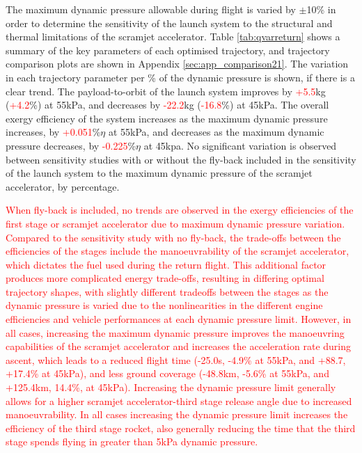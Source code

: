 The maximum dynamic pressure allowable during flight is varied by $\pm$10\% in order to determine the sensitivity of the launch system to the structural and thermal limitations of the scramjet accelerator.  
Table \ref{tab:qvarreturn} shows a summary of the key parameters of each optimised trajectory, and trajectory comparison plots are shown in Appendix \ref{sec:app_comparison21}. The variation in each trajectory parameter per \% of the dynamic pressure is shown, if there is a clear trend. The payload-to-orbit of the launch system improves by \textcolor{red}{+5.5}kg (\textcolor{red}{+4.2}\%) at 55kPa, and decreases by \textcolor{red}{-22.2}kg (\textcolor{red}{-16.8}\%) at 45kPa.
The overall exergy efficiency of the system increases as the maximum dynamic pressure increases, by \textcolor{red}{+0.051}\%$\eta$ at 55kPa, and decreases as the maximum dynamic pressure decreases, by \textcolor{red}{-0.225}\%$\eta$ at 45kpa. 
No significant variation is observed between sensitivity studies with or without the fly-back included in the sensitivity of the launch system to the maximum dynamic pressure of the scramjet accelerator, by percentage.

\textcolor{red}{
When fly-back is included, no trends are observed in the exergy efficiencies of the first stage or scramjet accelerator due to maximum dynamic pressure variation. Compared to the sensitivity study with no fly-back, the trade-offs between the efficiencies of the stages include the manoeuvrability of the scramjet accelerator, which dictates the fuel used during the return flight. This additional factor produces more complicated energy trade-offs, resulting in differing optimal trajectory shapes, with slightly different tradeoffs between the stages as the dynamic pressure is varied due to the nonlinearities in the different engine efficiencies and vehicle performances at each dynamic pressure limit.
However, in all cases, increasing the maximum dynamic pressure improves the manoeuvring capabilities of the scramjet accelerator and increases the acceleration rate during ascent, which leads to a reduced flight time (-25.0s, -4.9\% at 55kPa, and +88.7, +17.4\% at 45kPa), and less ground coverage (-48.8km, -5.6\% at 55kPa, and +125.4km, 14.4\%, at 45kPa). Increasing the dynamic pressure limit generally allows for a higher scramjet accelerator-third stage release angle due to increased manoeuvrability. In all cases increasing the dynamic pressure limit increases the efficiency of the third stage rocket, also generally reducing the time that the third stage spends flying in greater than 5kPa dynamic pressure. }


